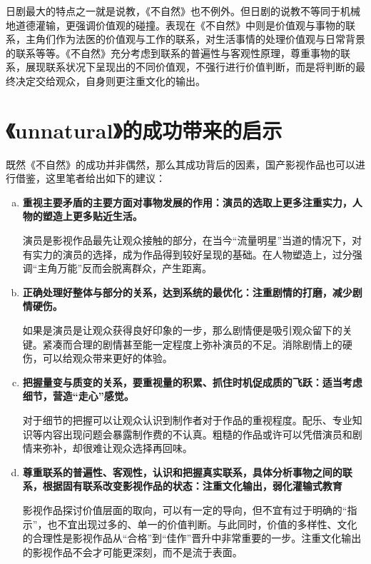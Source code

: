 \documentclass[12pt]{article}%
\begin{document}
日剧最大的特点之一就是说教，《不自然》也不例外。但日剧的说教不等同于机械地道德灌输，更强调价值观的碰撞。表现在《不自然》中则是价值观与事物的联系，主角们作为法医的价值观与工作的联系，对生活事情的处理价值观与日常背景的联系等等。《不自然》充分考虑到联系的普遍性与客观性原理，尊重事物的联系，展现联系状况下呈现出的不同价值观，不强行进行价值判断，而是将判断的最终决定交给观众，自身则更注重文化的输出。
\section{《unnatural》的成功带来的启示}
既然《不自然》的成功并非偶然，那么其成功背后的因素，国产影视作品也可以进行借鉴，这里笔者给出如下的建议：
\begin{enumerate}[a).]
\item \textbf{重视主要矛盾的主要方面对事物发展的作用：演员的选取上更多注重实力，人物的塑造上更多贴近生活。}

演员是影视作品最先让观众接触的部分，在当今“流量明星”当道的情况下，对有实力的演员的选择，成为作品得到较好呈现的基础。在人物塑造上，过分强调“主角万能”反而会脱离群众，产生距离。
\item \textbf{正确处理好整体与部分的关系，达到系统的最优化：注重剧情的打磨，减少剧情硬伤。}

如果是演员是让观众获得良好印象的一步，那么剧情便是吸引观众留下的关键。紧凑而合理的剧情甚至能一定程度上弥补演员的不足。消除剧情上的硬伤，可以给观众带来更好的体验。
\item \textbf{把握量变与质变的关系，要重视量的积累、抓住时机促成质的飞跃：适当考虑细节，营造“走心”感觉。}

对于细节的把握可以让观众认识到制作者对于作品的重视程度。配乐、专业知识等内容出现问题会暴露制作费的不认真。粗糙的作品或许可以凭借演员和剧情来弥补，却很难让观众选择再回味。
\item \textbf{尊重联系的普遍性、客观性，认识和把握真实联系，具体分析事物之间的联系，根据固有联系改变影视作品的状态：注重文化输出，弱化灌输式教育}

影视作品探讨价值层面的取向，可以有一定的导向，但不宜有过于明确的“指示”，也不宜出现过多的、单一的价值判断。与此同时，价值的多样性、文化的合理性是影视作品从“合格”到“佳作”晋升中非常重要的一步。注重文化输出的影视作品不会才可能更深刻，而不是流于表面。
\end{enumerate}

\appendix
\end{document}

